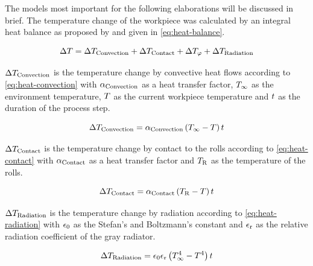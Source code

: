
The models most important for the following elaborations will be discussed in brief.
The temperature change of the workpiece was calculated by an integral heat balance as proposed by \textcite{Hensel1990} and given in \autoref{eq:heat-balance}.

\begin{equation}
    \Delta{T} = \Delta{T}_{\mathrm{Convection}} + \Delta{T}_{\mathrm{Contact}} + \Delta{T}_{{\varphi}} + \Delta{T}_{\mathrm{Radiation}}
    \label{eq:heat-balance}
\end{equation}

\noindent$\Delta{T}_{\mathrm{Convection}}$ is the temperature change by convective heat flows according to \autoref{eq:heat-convection} with ${\alpha}_{{\mathrm{Convection}}}$ as a heat transfer factor, ${T}_{\infty}$ as the environment temperature, ${T}$ as the current workpiece temperature and ${t}$ as the duration of the process step.

\begin{equation}
    \Delta{T}_{\mathrm{Convection}} = {\alpha}_{{\mathrm{Convection}}} \left( {T}_{\infty} - {T} \right) {t}
    \label{eq:heat-convection}
\end{equation}

\noindent$\Delta{T}_{\mathrm{Contact}}$ is the temperature change by contact to the rolls according to \autoref{eq:heat-contact} with ${\alpha}_{{\mathrm{Contact}}}$ as a heat transfer factor and ${T}_{{\mathrm{R}}}$ as the temperature of the rolls.

\begin{equation}
    \Delta{T}_{\mathrm{Contact}} = {\alpha}_{{\mathrm{Contact}}} \left( {T}_{\mathrm{R}} - {T} \right) {t}
    \label{eq:heat-contact}
\end{equation}

\noindent$\Delta{T}_{\mathrm{Radiation}}$ is the temperature change by radiation according to \autoref{eq:heat-radiation} with ${\epsilon_0}$ as the Stefan's and Boltzmann's constant and ${\epsilon_\mathrm{r}}$ as the relative radiation coefficient of the gray radiator.

\begin{equation}
    \Delta{T}_{\mathrm{Radiation}} = {\epsilon_0} {\epsilon_\mathrm{r}} \left( {T}_{\infty}^4 - {T}^4 \right) {t}
    \label{eq:heat-radiation}
\end{equation}

